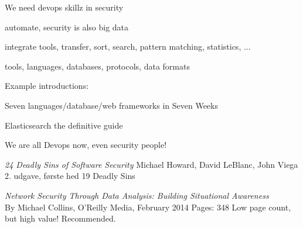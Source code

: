 \documentclass[20pt,landscape,a4paper,footrule]{foils}
\begin{document}
\begin{list1}
\item We need devops skillz in security
\item automate, security is also big data
\item integrate tools, transfer, sort, search, pattern matching, statistics, ...
\item tools, languages, databases, protocols, data formats
\item Example introductions:
\begin{list2}
\item Seven languages/database/web frameworks in Seven Weeks
\item Elasticsearch the definitive guide\\
\item {}
\item {}
\end{list2}
\end{list1}

\centerline{We are all Devops now, even security people!}




\begin{list1}


\item \emph{24 Deadly Sins of Software Security}
Michael Howard, David LeBlanc, John Viega 2. udgave, første hed 19 Deadly Sins

\item \emph{Network Security Through Data Analysis: Building Situational Awareness}\\
By Michael Collins, O'Reilly Media, February 2014 Pages: 348
Low page count, but high value! Recommended.
\end{list1}


\myquestionspage
\end{document}
